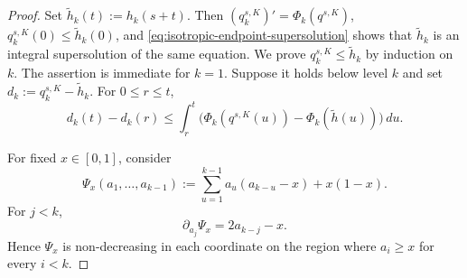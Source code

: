 \documentclass[10pt,a4paper]{amsart}
\begin{document}
\begin{proof}
Set $\widetilde h_k(t):=h_k(s+t)$. Then
$(q_k^{s,K})'=\Phi_k(q^{s,K})$,
$q_k^{s,K}(0)\leq\widetilde h_k(0)$, and
\eqref{eq:isotropic-endpoint-supersolution} shows that
$\widetilde h_k$ is an integral supersolution of the same equation.
We prove $q_k^{s,K}\leq\widetilde h_k$ by induction on $k$. The assertion
is immediate for $k=1$.
Suppose it holds below level $k$ and set
$d_k:=q_k^{s,K}-\widetilde h_k$. For $0\leq r\leq t$,
\[
d_k(t)-d_k(r)
\leq
\int_r^t
\bigl(\Phi_k(q^{s,K}(u))-\Phi_k(\widetilde h(u))\bigr)\,du.
\]

For fixed \(x\in[0,1]\), consider
\[
        \Psi_x(a_1,\ldots,a_{k-1})
        :=
        \sum_{u=1}^{k-1}a_u(a_{k-u}-x)+x(1-x).
\]
For \(j<k\),
\[
        \partial_{a_j}\Psi_x
        =2a_{k-j}-x.
\]
Hence \(\Psi_x\) is non-decreasing in each coordinate on the region
where \(a_i\geq x\) for every \(i<k\).


\end{proof}
\end{document}
